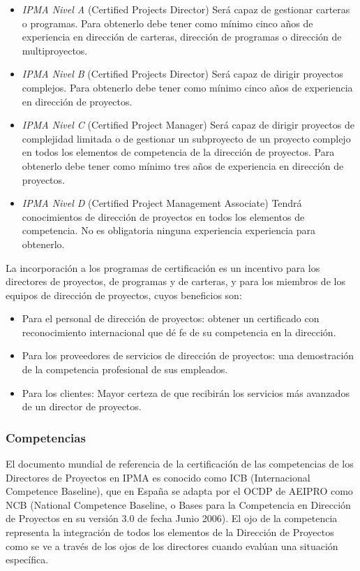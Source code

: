 \begin{itemize}
	\item \emph{IPMA Nivel A} (Certified Projects Director) Será capaz de gestionar carteras o programas. Para obtenerlo debe tener como mínimo cinco años de experiencia en dirección de carteras, dirección de programas o dirección de multiproyectos.
	\item \emph{IPMA Nivel B} (Certified Projects Director) Será capaz de dirigir proyectos complejos. Para obtenerlo debe tener como mínimo cinco años de experiencia en dirección de proyectos.
	\item \emph{IPMA Nivel C} (Certified Project Manager) Será capaz de dirigir proyectos de complejidad limitada o de gestionar un subproyecto de un proyecto complejo en todos los elementos de competencia de la dirección de proyectos. Para obtenerlo debe tener como mínimo tres años de experiencia en dirección de proyectos.
	\item \emph{IPMA Nivel D} (Certified Project Management Associate) Tendrá conocimientos de dirección de proyectos en todos los elementos de competencia. No es obligatoria ninguna experiencia experiencia para obtenerlo.
\end{itemize}

La incorporación a los programas de certificación es un incentivo para los directores de proyectos, de programas y de carteras, y para los miembros de los equipos de dirección de proyectos, cuyos beneficios son:

\begin{itemize}
	\item Para el personal de dirección de proyectos: obtener un certificado con reconocimiento internacional que dé fe de su competencia en la dirección.
	\item Para los proveedores de servicios de dirección de proyectos: una demostración de la competencia profesional de sus empleados.
	\item Para los clientes: Mayor certeza de que recibirán los servicios más avanzados de un director de proyectos.
\end{itemize}

\subsubsection{Competencias}

El documento mundial de referencia de la certificación de las competencias de los Directores de Proyectos en IPMA es conocido como ICB (Internacional Competence Baseline), que en España se adapta por el OCDP de AEIPRO como NCB (National Competence Baseline, o Bases para la Competencia en Dirección de Proyectos en su versión 3.0 de fecha Junio 2006). El ojo de la competencia representa la integración de todos los elementos de la Dirección de Proyectos como se ve a través de los ojos de los directores cuando evalúan una situación específica.\\

